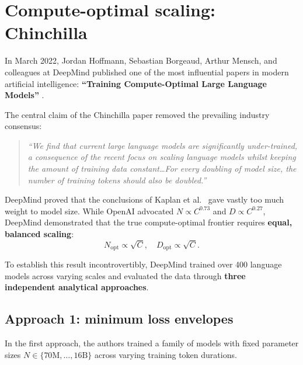 \documentclass[../../main.tex]{subfiles}
\begin{document}
\section{Compute-optimal scaling: Chinchilla}
\label{sec:chinchilla_optimality}

In March 2022, Jordan Hoffmann, Sebastian Borgeaud, Arthur Mensch, and colleagues at DeepMind published one of the most influential papers in modern artificial intelligence: \textbf{``Training Compute-Optimal Large Language Models''} \cite{hoffmann2022}.

The central claim of the Chinchilla paper removed the prevailing industry consensus:
\begin{quote}
\emph{``We find that current large language models are significantly under-trained, a consequence of the recent focus on scaling language models whilst keeping the amount of training data constant\dots For every doubling of model size, the number of training tokens should also be doubled.''}
\end{quote}

DeepMind proved that the conclusions of Kaplan et al.~\cite{kaplan2020} gave vastly too much weight to model size. While OpenAI advocated $N \propto C^{0.73}$ and $D \propto C^{0.27}$, DeepMind demonstrated that the true compute-optimal frontier requires \textbf{equal, balanced scaling}:
\begin{equation}
\label{eq:equal_scaling_rule}
N_{\text{opt}} \propto \sqrt{C}, \quad D_{\text{opt}} \propto \sqrt{C}.
\end{equation}

To establish this result incontrovertibly, DeepMind trained over 400 language models across varying scales and evaluated the data through \textbf{three independent analytical approaches}.

\subsection{Approach 1: minimum loss envelopes}
\label{subsec:chinchilla_approach1}

In the first approach, the authors trained a family of models with fixed parameter sizes $N \in \{70\text{M}, \dots, 16\text{B}\}$ across varying training token durations. 
\end{document}
